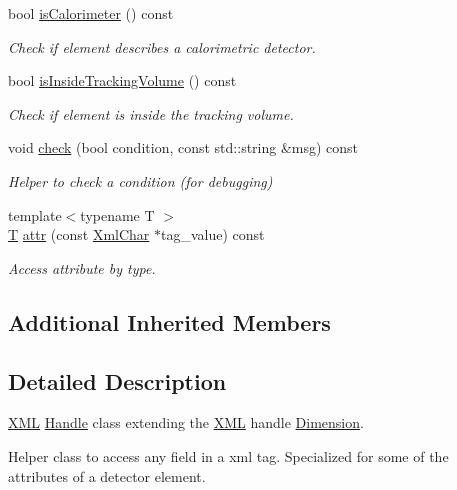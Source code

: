 \begin{DoxyCompactItemize}
bool \hyperlink{struct_d_d4hep_1_1_x_m_l_1_1_det_element_a9c03d68f45b2ff358425287d93d88cd9}{is\+Calorimeter} () const
\begin{DoxyCompactList}\small\item\em Check if element describes a calorimetric detector. \end{DoxyCompactList}\item 
bool \hyperlink{struct_d_d4hep_1_1_x_m_l_1_1_det_element_ae10b1a35a95e9b6d043ba37e8145f715}{is\+Inside\+Tracking\+Volume} () const
\begin{DoxyCompactList}\small\item\em Check if element is inside the tracking volume. \end{DoxyCompactList}\item 
void \hyperlink{struct_d_d4hep_1_1_x_m_l_1_1_det_element_aee32c6df93ab1cb7d6dc36e7ae855112}{check} (bool condition, const std\+::string \&msg) const
\begin{DoxyCompactList}\small\item\em Helper to check a condition (for debugging) \end{DoxyCompactList}\item 
{\footnotesize template$<$typename T $>$ }\\\hyperlink{class_t}{T} \hyperlink{struct_d_d4hep_1_1_x_m_l_1_1_det_element_a3de12322c14de0035be56f4a6a5f12ec}{attr} (const \hyperlink{namespace_d_d4hep_1_1_x_m_l_a09e5d9cc86ed782f6826dfe0778c1815}{Xml\+Char} $\ast$tag\+\_\+value) const
\begin{DoxyCompactList}\small\item\em Access attribute by type. \end{DoxyCompactList}\end{DoxyCompactItemize}
\subsection*{Additional Inherited Members}


\subsection{Detailed Description}
\hyperlink{namespace_d_d4hep_1_1_x_m_l}{X\+ML} \hyperlink{class_d_d4hep_1_1_handle}{Handle} class extending the \hyperlink{namespace_d_d4hep_1_1_x_m_l}{X\+ML} handle \hyperlink{struct_d_d4hep_1_1_x_m_l_1_1_dimension}{Dimension}. 

Helper class to access any field in a xml tag. Specialized for some of the attributes of a detector element.

